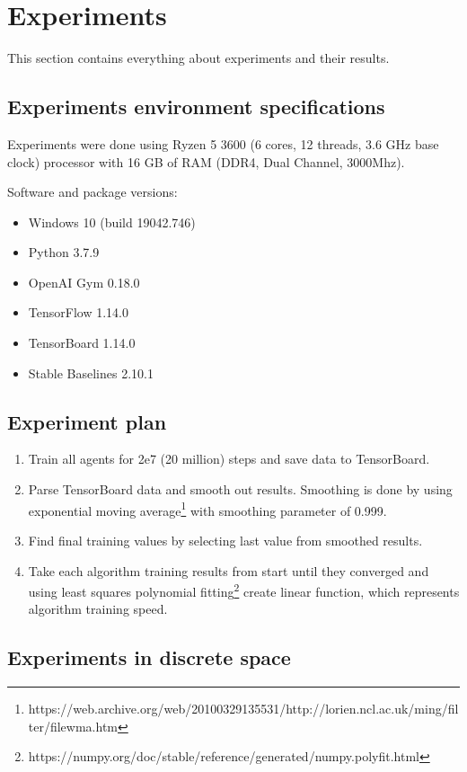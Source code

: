 \documentclass[12pt, a4paper]{article}
\begin{document}
\section{Experiments}

This section contains everything about experiments and their results.

\subsection{Experiments environment specifications}

Experiments were done using Ryzen 5 3600 (6 cores, 12 threads, 3.6 GHz base clock) processor with 16 GB of RAM (DDR4, Dual Channel, 3000Mhz).

Software and package versions:
\begin{itemize}
    \item Windows 10 (build 19042.746)
    \item Python 3.7.9
    \item OpenAI Gym 0.18.0
    \item TensorFlow 1.14.0
    \item TensorBoard 1.14.0
    \item Stable Baselines 2.10.1
\end{itemize}

\subsection{Experiment plan}

\begin{enumerate}
  \item Train all agents for 2e7 (20 million) steps and save data to TensorBoard.
  \item Parse TensorBoard data and smooth out results. Smoothing is done by using exponential moving average\footnote{https://web.archive.org/web/20100329135531/http://lorien.ncl.ac.uk/ming/filter/filewma.htm} with smoothing parameter of 0.999.
  \item Find final training values by selecting last value from smoothed results.
  \item Take each algorithm training results from start until they converged and using least squares polynomial fitting\footnote{https://numpy.org/doc/stable/reference/generated/numpy.polyfit.html} create linear function, which represents algorithm training speed.
\end{enumerate}

\subsection{Experiments in discrete space}
\end{document}
